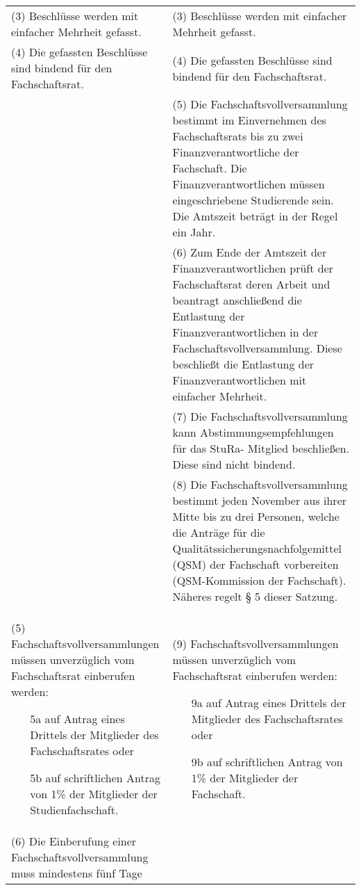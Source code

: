 {\begin{longtable}{|p{7.5cm}|p{7.5cm}|}
        (3)  Beschlüsse werden mit einfacher Mehrheit gefasst.&
        (3)  Beschlüsse werden mit einfacher Mehrheit gefasst.\\
        (4)  Die gefassten Beschlüsse sind bindend für den Fachschaftsrat.&
        (4)  Die gefassten Beschlüsse sind bindend für den Fachschaftsrat.\\
        &
        (5) Die Fachschaftsvollversammlung bestimmt im Einvernehmen des Fachschaftsrats bis
        zu zwei Finanzverantwortliche der Fachschaft. Die Finanzverantwortlichen müssen
        eingeschriebene Studierende sein. Die Amtszeit beträgt in der Regel ein Jahr. \\
        &
        (6) Zum Ende der Amtszeit der Finanzverantwortlichen prüft der Fachschaftsrat deren
        Arbeit und beantragt anschließend die Entlastung der Finanzverantwortlichen in der
        Fachschaftsvollversammlung. Diese beschließt die Entlastung der
        Finanzverantwortlichen mit einfacher Mehrheit.\\
        &(7) Die Fachschaftsvollversammlung kann Abstimmungsempfehlungen für das StuRa-
        Mitglied beschließen. Diese sind nicht bindend.\\
        &(8) Die Fachschaftsvollversammlung bestimmt jeden November aus ihrer Mitte bis zu
        drei Personen, welche die Anträge für die Qualitätssicherungsnachfolgemittel (QSM)
        der Fachschaft vorbereiten (QSM-Kommission der Fachschaft). Näheres regelt § 5 dieser
        Satzung.\\
        (5)  Fachschaftsvollversammlungen müssen unverzüglich vom Fachschaftsrat
        einberufen werden:
        \begin{itemize}
        \item[5a]auf Antrag eines Drittels der Mitglieder des Fachschaftsrates oder
        \item[5b]auf schriftlichen Antrag von 1\% der Mitglieder der Studienfachschaft. 
        \end{itemize}&(9)  Fachschaftsvollversammlungen müssen unverzüglich vom Fachschaftsrat einberufen
        werden:
        \begin{itemize}
        \item[9a] auf Antrag eines Drittels der Mitglieder des Fachschaftsrates oder
        \item[9b] auf schriftlichen Antrag von 1\% der Mitglieder der Fachschaft. 
        \end{itemize}\\
        (6) Die Einberufung einer Fachschaftsvollversammlung muss mindestens fünf Tage

\end{longtable}}
